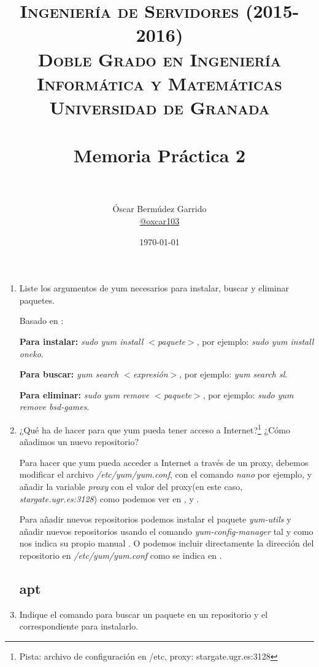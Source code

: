 \documentclass[paper=a4, fontsize=11pt]{scrartcl} %
\title{	
\normalfont \normalsize 
\textsc{{\bf Ingeniería de Servidores (2015-2016)} \\ Doble Grado en Ingeniería Informática y Matemáticas \\ Universidad de Granada} \\ [25pt] %
\horrule{0.5pt} \\[0.4cm] %
\huge Memoria Práctica 2 \\ %
\horrule{2pt} \\[0.5cm] %
}
\author{Óscar Bermúdez Garrido\\ \href{http://www.github.com/oxcar103}{@oxcar103}} %
\date{\normalsize\today} %
\numberwithin{equation}{section} %
\numberwithin{figure}{section} %
\numberwithin{table}{section} %
\begin{document}
\maketitle %
\newpage %
\tableofcontents %
\listoffigures

\begin{enumerate}
	\section{Instalación de servicios y configuración}
	\subsection{yum}
		\item Liste los argumentos de yum necesarios para instalar, buscar y eliminar paquetes.
		
		Basado en \cite{man_yum}:
		
		\textbf{Para instalar:} \textit{sudo yum install $<$paquete$>$}, por ejemplo: \textit{sudo yum
		install oneko}.
		
		\textbf{Para buscar:} \textit{yum search $<$expresión$>$}, por ejemplo: \textit{yum search sl}.
		
		\textbf{Para eliminar:} \textit{sudo yum remove $<$paquete$>$}, por ejemplo: \textit{sudo yum
		remove bsd-games}.
		
		
		\item ¿Qué ha de hacer para que yum pueda tener acceso a Internet?\footnote{Pista: archivo de
		configuración en /etc, proxy: stargate.ugr.es:3128} ¿Cómo añadimos un nuevo repositorio?
		
		Para hacer que yum pueda acceder a Internet a través de un proxy, debemos modificar el archivo
		\textit{/etc/yum/yum.conf}, con el comando \textit{nano} por ejemplo, y añadir la variable
		\textit{proxy} con el valor del proxy(en este caso, \textit{stargate.ugr.es:3128}) como podemos
		ver en \cite{man_yum.conf}, \cite{CentOS_web} y \cite{foro_Fedora}.
		
		Para añadir nuevos repositorios podemos instalar el paquete \textit{yum-utils} y añadir nuevos
		repositorios usando el comando \textit{yum-config-manager} tal y como nos indica su propio
		manual \cite{man_yum-config-manager}. O podemos incluir directamente la dirección del repositorio
		en \textit{/etc/yum/yum.conf} como se indica en \cite{man_yum.conf}.
	
	\subsection{apt}
		\item Indique el comando para buscar un paquete en un repositorio y el correspondiente para
		instalarlo.
		

\end{enumerate}
\end{document}
